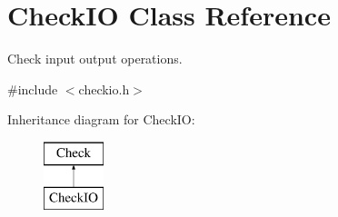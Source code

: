\hypertarget{class_check_i_o}{\section{Check\-I\-O Class Reference}
\label{class_check_i_o}
}


Check input output operations.  




{\ttfamily \#include $<$checkio.\-h$>$}

Inheritance diagram for Check\-I\-O\-:\begin{figure}[H]
\begin{center}
\leavevmode
\includegraphics[height=2.000000cm]{class_check_i_o}
\end{center}
\end{figure}
